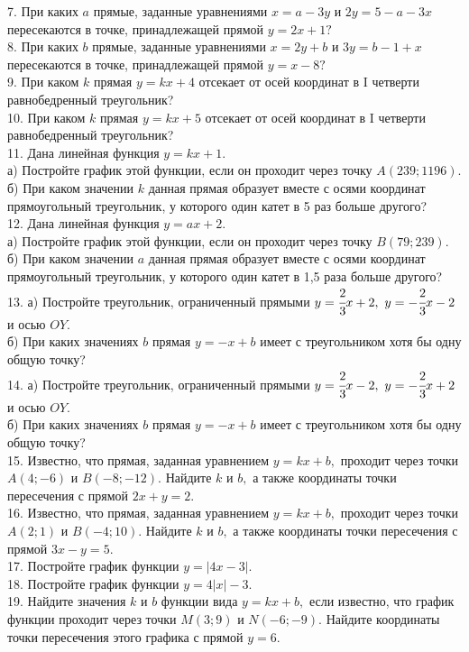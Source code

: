7. При каких $a$ прямые, заданные уравнениями $x=a-3y$ и $2y=5-a-3x$ пересекаются в точке, принадлежащей прямой $y=2x+1?$\\
8. При каких $b$ прямые, заданные уравнениями $x=2y+b$ и $3y=b-1+x$ пересекаются в точке, принадлежащей прямой $y=x-8?$\\
9. При каком $k$ прямая $y=kx+4$ отсекает от осей координат в I четверти равнобедренный треугольник?\\
10. При каком $k$ прямая $y=kx+5$ отсекает от осей координат в I четверти равнобедренный треугольник?\\
11. Дана линейная функция $y=kx+1.$\\
а) Постройте график этой функции, если он проходит через точку $A(239;1196).$\\
б) При каком значении $k$ данная прямая образует вместе с осями координат прямоугольный треугольник, у которого один катет в 5 раз больше другого?\\
12. Дана линейная функция $y=ax+2.$\\
а) Постройте график этой функции, если он проходит через точку $B(79;239).$\\
б) При каком значении $a$ данная прямая образует вместе с осями координат прямоугольный треугольник, у которого один катет в 1,5 раза больше другого?\\
13. а) Постройте треугольник, ограниченный прямыми $y=\cfrac{2}{3}x+2,\ y=-\cfrac{2}{3}x-2$ и осью $OY.$\\
б) При каких значениях $b$ прямая $y=-x+b$ имеет с треугольником хотя бы одну общую точку?\\
14. а) Постройте треугольник, ограниченный прямыми $y=\cfrac{2}{3}x-2,\ y=-\cfrac{2}{3}x+2$ и осью $OY.$\\
б) При каких значениях $b$ прямая $y=-x+b$ имеет с треугольником хотя бы одну общую точку?\\
15. Известно, что прямая, заданная уравнением $y=kx+b,$ проходит через точки $A(4;-6)$ и $B(-8;-12).$ Найдите $k$ и $b,$ а также координаты точки пересечения с прямой $2x+y=2.$\\
16. Известно, что прямая, заданная уравнением $y=kx+b,$ проходит через точки $A(2;1)$ и $B(-4;10).$ Найдите $k$ и $b,$ а также координаты точки пересечения с прямой $3x-y=5.$\\
17. Постройте график функции $y=|4x-3|.$\\
18. Постройте график функции $y=4|x|-3.$\\
19. Найдите значения $k$ и $b$ функции вида $y=kx+b,$ если известно, что график функции проходит через точки $M(3;9)$ и $N(-6;-9).$ Найдите координаты точки пересечения этого графика с прямой $y=6.$\\

